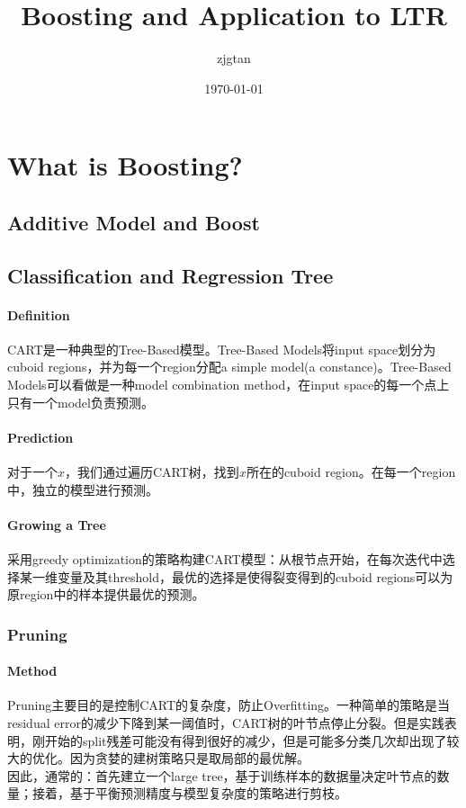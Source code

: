 \documentclass[a4paper]{article}
\begin{document}
\title{Boosting and Application to LTR}
\author{zjgtan}
\date{\today}
\maketitle

\section{What is Boosting?}
\subsection{Additive Model and Boost}

\subsection{Classification and Regression Tree}
\paragraph{Definition}CART是一种典型的Tree-Based模型。Tree-Based Models将input space划分为cuboid regions，并为每一个region分配a simple model(a constance)。Tree-Based Models可以看做是一种model combination method，在input space的每一个点上只有一个model负责预测。

\paragraph{Prediction}对于一个$x$，我们通过遍历CART树，找到$x$所在的cuboid region。在每一个region中，独立的模型进行预测。

\paragraph{Growing a Tree}采用greedy optimization的策略构建CART模型：从根节点开始，在每次迭代中选择某一维变量及其threshold，最优的选择是使得裂变得到的cuboid regions可以为原region中的样本提供最优的预测。

\subsubsection{Pruning}
\paragraph{Method}Pruning主要目的是控制CART的复杂度，防止Overfitting。一种简单的策略是当residual error的减少下降到某一阈值时，CART树的叶节点停止分裂。但是实践表明，刚开始的split残差可能没有得到很好的减少，但是可能多分类几次却出现了较大的优化。因为贪婪的建树策略只是取局部的最优解。\\
因此，通常的：首先建立一个large tree，基于训练样本的数据量决定叶节点的数量；接着，基于平衡预测精度与模型复杂度的策略进行剪枝。
\end{document}
